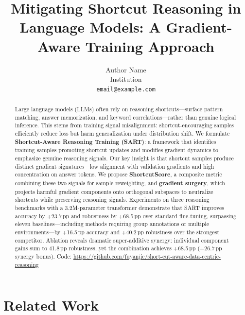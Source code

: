 \documentclass{article}
\title{Mitigating Shortcut Reasoning in Language Models: A Gradient-Aware Training Approach}
\author{Author Name \\ Institution \\ \texttt{email@example.com}}
\date{}
\begin{document}
\maketitle

\begin{abstract}
Large language models (LLMs) often rely on reasoning shortcuts---surface pattern matching, answer memorization, and keyword correlations---rather than genuine logical inference. This stems from training signal misalignment: shortcut-encouraging samples efficiently reduce loss but harm generalization under distribution shift. We formulate \textbf{Shortcut-Aware Reasoning Training (SART)}: a framework that identifies training samples promoting shortcut updates and modifies gradient dynamics to emphasize genuine reasoning signals. Our key insight is that shortcut samples produce distinct gradient signatures---low alignment with validation gradients and high concentration on answer tokens. We propose \textbf{ShortcutScore}, a composite metric combining these two signals for sample reweighting, and \textbf{gradient surgery}, which projects harmful gradient components onto orthogonal subspaces to neutralize shortcuts while preserving reasoning signals. Experiments on three reasoning benchmarks with a 3.2M-parameter transformer demonstrate that SART improves accuracy by +23.7\,pp and robustness by +68.5\,pp over standard fine-tuning, surpassing eleven baselines---including methods requiring group annotations or multiple environments---by +16.5\,pp accuracy and +40.2\,pp robustness over the strongest competitor. Ablation reveals dramatic super-additive synergy: individual component gains sum to 41.8\,pp robustness, yet the combination achieves +68.5\,pp (+26.7\,pp synergy bonus). Code: \url{https://github.com/fuyanjie/short-cut-aware-data-centric-reasoning}
\end{abstract}







\section{Related Work}
\end{document}
